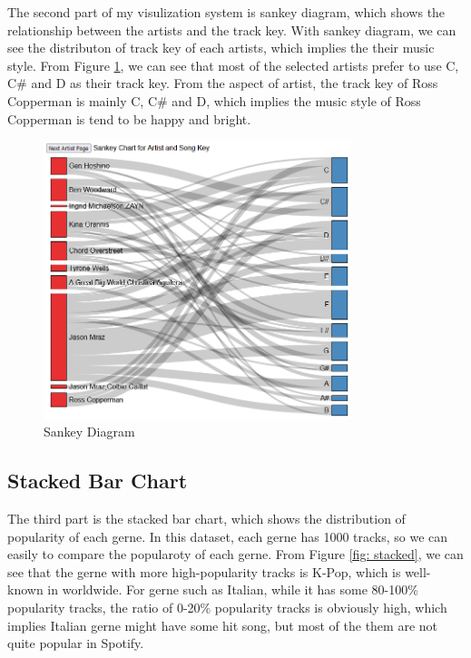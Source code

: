 \documentclass[a4paper, oneside, final, 12pt]{scrartcl} %
\begin{document}
The second part of my visulization system is sankey diagram, which shows the relationship
between the artists and the track key.
With sankey diagram, we can see the distributon of track key of each artists,
which implies the their music style.
From Figure \ref{fig: sankey}, we can see that most of the selected artists prefer to
use C, C\# and D as their track key.
From the aspect of artist, the track key of Ross Copperman
is mainly C, C\# and D, which implies the music style of Ross Copperman is tend to be
happy and bright.

\begin{figure}[h]
  \centering
  \includegraphics[width=0.8\textwidth]{Images/sankey.png}
  \caption{Sankey Diagram}
  \label{fig: sankey}
\end{figure}

\subsection{Stacked Bar Chart}

The third part is the stacked bar chart, which shows the distribution of popularity
of each gerne. In this dataset, each gerne has 1000 tracks, so we can easily to compare
the popularoty of each gerne.
From Figure \ref{fig: stacked}, we can see that the gerne with more high-popularity tracks
is K-Pop, which is well-known in worldwide.
For gerne such as Italian, while it has some 80-100\% popularity tracks,
the ratio of 0-20\% popularity tracks is obviously high, which implies Italian gerne
might have some hit song, but most of the them are not quite popular in Spotify.
\end{document}
